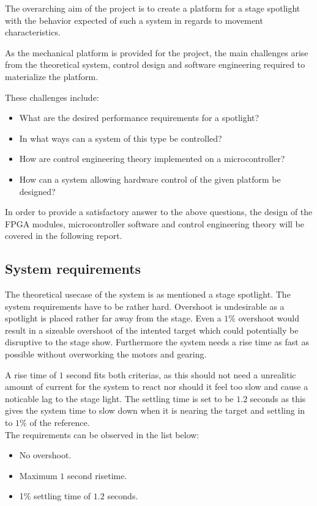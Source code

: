 \documentclass[../../main]{subfiles}
\begin{document}
The overarching aim of the project is to create a platform for a stage spotlight with the behavior expected of such a system in regards to movement characteristics.

As the mechanical platform is provided for the project, the main challenges arise from the theoretical system, control design and software engineering required to materialize the platform.

These challenges include:

\begin{itemize}
    \item What are the desired performance requirements for a spotlight?
    \item In what ways can a system of this type be controlled?
    \item How are control engineering theory implemented on a microcontroller?
    \item How can a system allowing hardware control of the given platform be designed?
\end{itemize}

In order to provide a satisfactory answer to the above questions, the design of the FPGA modules, microcontroller software and control engineering theory will be covered in the following report.

\subsection{System requirements}

The theoretical usecase of the system is as mentioned a stage spotlight. The system requirements have to be rather hard.
Overshoot is undesirable as a spotlight is placed rather far away from the stage. Even a $1\%$ overshoot would result in a sizeable overshoot of the intented target which could potentially be disruptive to the stage show.
Furthermore the system needs a rise time as fast as possible without overworking the motors and gearing.

A rise time of $1$ second fits both criterias, as this should not need a unrealitic amount of current for the system to react nor should it feel too slow and cause a noticable lag to the stage light.
The settling time is set to be $1.2$ seconds as this gives the system time to slow down when it is nearing the target and settling in to $1\%$ of the reference. 
\\
The requirements can be observed in the list below:

\begin{itemize}
  \item No overshoot.
  \item Maximum $1$ second risetime.
  \item 1\% settling time of $1.2$ seconds.
\end{itemize}
\end{document}
